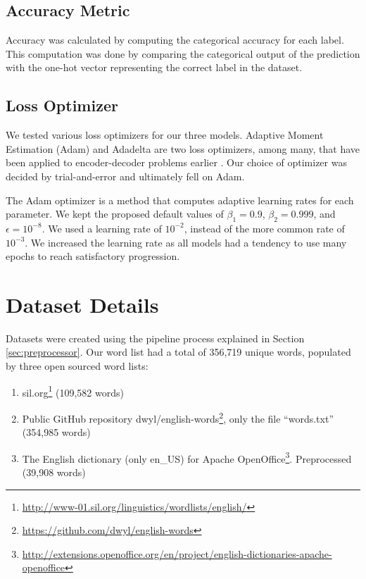\subsection{Accuracy Metric}
Accuracy was calculated by computing the categorical accuracy for each label. This computation was done by comparing the categorical output of the prediction with the one-hot vector representing the correct label in the dataset.

\subsection{Loss Optimizer}
We tested various loss optimizers for our three models. Adaptive Moment Estimation (Adam) \citep{kingma2014adam} and Adadelta \citep{zeiler2012adadelta} are two loss optimizers, among many, that have been applied to encoder-decoder problems earlier \citep{cho2014properties, arik2017deep}. Our choice of optimizer was decided by trial-and-error and ultimately fell on Adam.

The Adam optimizer is a method that computes adaptive learning rates for each parameter. We kept the proposed default values of \(\beta_{1} = 0.9\), \(\beta_{2} = 0.999\), and \(\epsilon = 10^{-8}\). We used a learning rate of \(10^{-2}\), instead of the more common rate of \(10^{-3}\). We increased the learning rate as all models had a tendency to use many epochs to reach satisfactory progression.

\newpage
\section{Dataset Details}
\label{sec:dataset_details}
Datasets were created using the pipeline process explained in Section \ref{sec:preprocessor}. Our word list had a total of 356,719 unique words, populated by three open sourced word lists:

\begin{enumerate}
    \item sil.org\footnote{\url{http://www-01.sil.org/linguistics/wordlists/english/}} (109,582 words)
    \item Public GitHub repository dwyl/english-words\footnote{\url{https://github.com/dwyl/english-words}}, only the file ``words.txt'' (354,985 words) 
    \item The English dictionary (only en\_US) for Apache OpenOffice\footnote{\url{http://extensions.openoffice.org/en/project/english-dictionaries-apache-openoffice}}. Preprocessed (39,908 words)
\end{enumerate}

